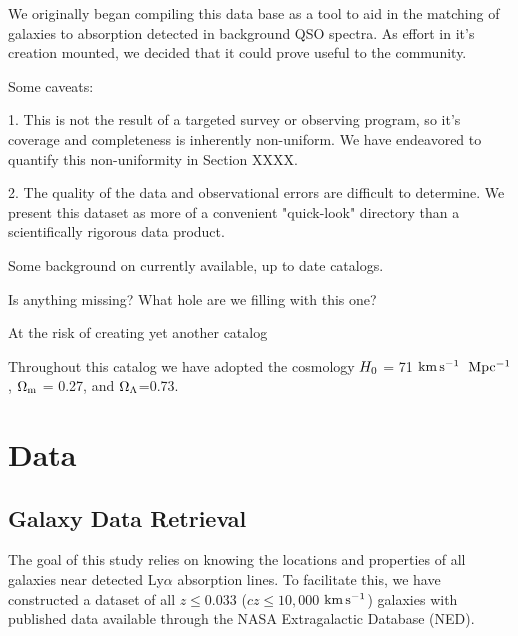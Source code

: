 \documentclass[iop]{emulateapj-rtx4}
\newcommand{\kms}{$\rm km\, s^{-1}$}
\begin{document}
We originally began compiling this data base as a tool to aid in the matching of galaxies to absorption detected in background QSO spectra. As effort in it's creation mounted, we decided that it could prove useful to the community.

Some caveats:

1. This is not the result of a targeted survey or observing program, so it's coverage and completeness is inherently non-uniform. We have endeavored to quantify this non-uniformity in Section XXXX.

2. The quality of the data and observational errors are difficult to determine. We present this dataset as more of a convenient "quick-look" directory than a scientifically rigorous data product.



Some background on currently available, up to date catalogs.

Is anything missing? What hole are we filling with this one?

At the risk of creating yet another catalog 


Throughout this catalog we have adopted the cosmology $H_{\rm 0}$ = 71 \kms ~$\rm Mpc^{-1}$, $\rm \Omega_m$ = 0.27, and $\rm \Omega_{\Lambda}$=0.73.

\section{Data}

\subsection{Galaxy Data Retrieval}

The goal of this study relies on knowing the locations and properties of all galaxies near detected Ly$\alpha$ absorption lines. To facilitate this, we have constructed a dataset of all $z\leq 0.033$ ($cz\leq 10,000$ \kms) galaxies with published data available through the NASA Extragalactic Database (NED). 
\end{document}
